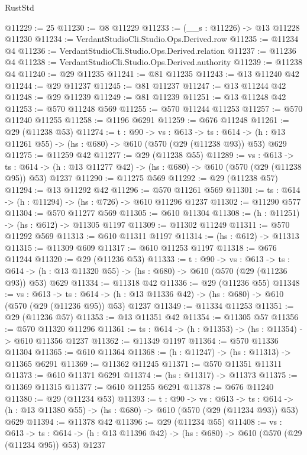 \begin{lexlean}{RustStd}
\begin{coremodule}
@11229 := 25
@11230 := @8 @11229
@11233 := (__s : @11226) -> @13 @11228 @11230
@11234 := VerdantStudioCli.Studio.Ops.Derived.row
@11235 := @11234 @4
@11236 := VerdantStudioCli.Studio.Ops.Derived.relation
@11237 := @11236 @4
@11238 := VerdantStudioCli.Studio.Ops.Derived.authority
@11239 := @11238 @4
@11240 := @29 @11235
@11241 := @81 @11235
@11243 := @13 @11240 @42
@11244 := @29 @11237
@11245 := @81 @11237
@11247 := @13 @11244 @42
@11248 := @29 @11239
@11249 := @81 @11239
@11251 := @13 @11248 @42
@11253 := @570 @11248 @569
@11255 := @570 @11244 @11253
@11257 := @570 @11240 @11255
@11258 := @1196 @6291
@11259 := @676 @11248
@11261 := @29 (@11238 @53)
@11274 := {t : @90} ->
  {vs : @613} ->
  {ts : @614} -> (h : @13 @11261 @55) -> (hs : @680) -> @610 (@570 (@29 (@11238 @93)) @53) @629
@11275 := @11259 @42
@11277 := @29 (@11238 @55)
@11289 := {vs : @613} ->
  {ts : @614} -> (h : @13 @11277 @42) -> (hs : @680) -> @610 (@570 (@29 (@11238 @95)) @53) @1237
@11290 := @11275 @569
@11292 := @29 (@11238 @57)
@11294 := @13 @11292 @42
@11296 := @570 @11261 @569
@11301 := {ts : @614} -> (h : @11294) -> (hs : @726) -> @610 @11296 @1237
@11302 := @11290 @577
@11304 := @570 @11277 @569
@11305 := @610 @11304
@11308 := (h : @11251) -> (hs : @612) -> @11305 @1197
@11309 := @11302 @11249
@11311 := @570 @11292 @569
@11313 := @610 @11311 @1197
@11314 := (hs : @612) -> @11313
@11315 := @11309 @609
@11317 := @610 @11253 @1197
@11318 := @676 @11244
@11320 := @29 (@11236 @53)
@11333 := {t : @90} ->
  {vs : @613} ->
  {ts : @614} -> (h : @13 @11320 @55) -> (hs : @680) -> @610 (@570 (@29 (@11236 @93)) @53) @629
@11334 := @11318 @42
@11336 := @29 (@11236 @55)
@11348 := {vs : @613} ->
  {ts : @614} -> (h : @13 @11336 @42) -> (hs : @680) -> @610 (@570 (@29 (@11236 @95)) @53) @1237
@11349 := @11334 @11253
@11351 := @29 (@11236 @57)
@11353 := @13 @11351 @42
@11354 := @11305 @57
@11356 := @570 @11320 @11296
@11361 := {ts : @614} -> (h : @11353) -> (hs : @11354) -> @610 @11356 @1237
@11362 := @11349 @1197
@11364 := @570 @11336 @11304
@11365 := @610 @11364
@11368 := (h : @11247) -> (hs : @11313) -> @11365 @6291
@11369 := @11362 @11245
@11371 := @570 @11351 @11311
@11373 := @610 @11371 @6291
@11374 := (hs : @11317) -> @11373
@11375 := @11369 @11315
@11377 := @610 @11255 @6291
@11378 := @676 @11240
@11380 := @29 (@11234 @53)
@11393 := {t : @90} ->
  {vs : @613} ->
  {ts : @614} -> (h : @13 @11380 @55) -> (hs : @680) -> @610 (@570 (@29 (@11234 @93)) @53) @629
@11394 := @11378 @42
@11396 := @29 (@11234 @55)
@11408 := {vs : @613} ->
  {ts : @614} -> (h : @13 @11396 @42) -> (hs : @680) -> @610 (@570 (@29 (@11234 @95)) @53) @1237

\end{coremodule}
\end{lexlean}
